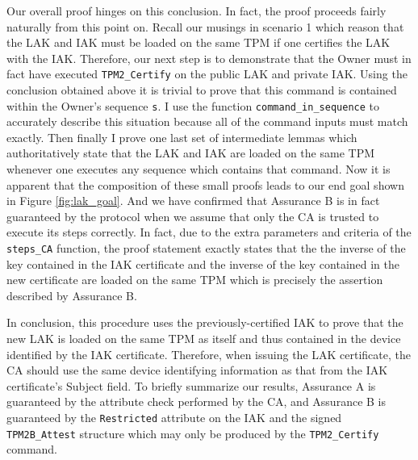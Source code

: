 Our overall proof hinges on this conclusion. In fact, the proof proceeds fairly naturally from this point on. Recall our musings in scenario 1 which reason that the LAK and IAK must be loaded on the same TPM if one certifies the LAK with the IAK. Therefore, our next step is to demonstrate that the Owner must in fact have executed \verb|TPM2_Certify| on the public LAK and private IAK. 
Using the conclusion obtained above it is trivial to prove that this command is contained within the Owner's sequence \verb|s|.
I use the function \verb|command_in_sequence| to accurately describe this situation because all of the command inputs must match exactly. 
Then finally I prove one last set of intermediate lemmas which authoritatively state that the LAK and IAK are  loaded on the same TPM whenever one executes any sequence which contains that command.
Now it is apparent that the composition of these small proofs leads to our end goal shown in Figure \ref{fig:lak_goal}.
And we have confirmed that Assurance B is in fact guaranteed by the protocol when we assume that only the CA is trusted to execute its steps correctly. 
In fact, due to the extra parameters and criteria of the \verb|steps_CA| function, the proof statement exactly states that the the inverse of the key contained in the IAK certificate and the inverse of the key contained in the new certificate are loaded on the same TPM which is precisely the assertion described by Assurance B. 


In conclusion, this procedure uses the previously-certified IAK to prove that the new LAK is loaded on the same TPM as itself and thus contained in the device identified by the IAK certificate. Therefore, when issuing the LAK certificate, the CA should use the same device identifying information as that from the IAK certificate's Subject field. To briefly summarize our results, Assurance A is guaranteed by the attribute check performed by the CA, and Assurance B is guaranteed by the \verb|Restricted| attribute on the IAK and the signed \verb|TPM2B_Attest| structure which may only be produced by the \verb|TPM2_Certify| command.






\newpage
